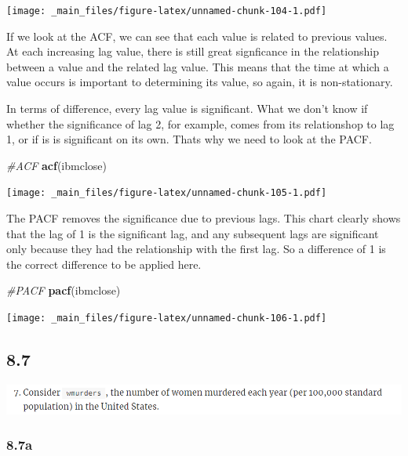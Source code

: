 \documentclass[]{book}
\newenvironment{Shaded}{\begin{snugshade}}{\end{snugshade}}
\newcommand{\CommentTok}[1]{\textcolor[rgb]{0.56,0.35,0.01}{\textit{#1}}}
\newcommand{\KeywordTok}[1]{\textcolor[rgb]{0.13,0.29,0.53}{\textbf{#1}}}
\newcommand{\NormalTok}[1]{#1}
\begin{document}
\texttt{[image: \_main\_files/figure-latex/unnamed-chunk-104-1.pdf]}

If we look at the ACF, we can see that each value is related to previous values. At each increasing lag value, there is still great signficance in the relationship between a value and the related lag value. This means that the time at which a value occurs is important to determining its value, so again, it is non-stationary.

In terms of difference, every lag value is significant. What we don't know if whether the significance of lag 2, for example, comes from its relationshop to lag 1, or if is is significant on its own. Thats why we need to look at the PACF.

\begin{Shaded}
\begin{Highlighting}[]
\CommentTok{#ACF}
\KeywordTok{acf}\NormalTok{(ibmclose)}
\end{Highlighting}
\end{Shaded}

\texttt{[image: \_main\_files/figure-latex/unnamed-chunk-105-1.pdf]}

The PACF removes the significance due to previous lags. This chart clearly shows that the lag of 1 is the significant lag, and any subsequent lags are significant only because they had the relationship with the first lag. So a difference of 1 is the correct difference to be applied here.

\begin{Shaded}
\begin{Highlighting}[]
\CommentTok{#PACF}
\KeywordTok{pacf}\NormalTok{(ibmclose)}
\end{Highlighting}
\end{Shaded}

\texttt{[image: \_main\_files/figure-latex/unnamed-chunk-106-1.pdf]}

\hypertarget{section-14}{%
\subsection{8.7}\label{section-14}}

\includegraphics{./week5/8.7.png}

\hypertarget{a-8}{%
\subsubsection{8.7a}\label{a-8}}
\end{document}
